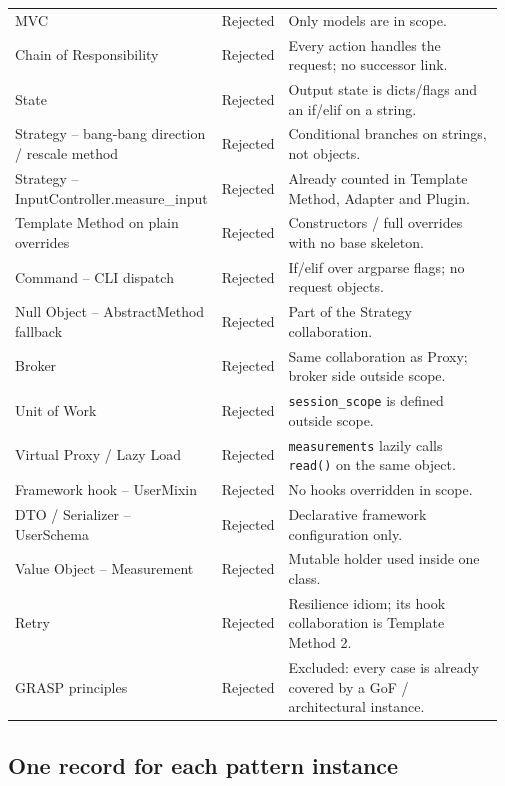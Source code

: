 \documentclass[11pt,a4paper]{article}
\begin{document}
{\begin{longtable}{@{}P{0.29\linewidth}P{0.12\linewidth}P{0.56\linewidth}@{}}
MVC & Rejected & Only models are in scope. \\
Chain of Responsibility & Rejected & Every action handles the request; no successor link. \\
State & Rejected & Output state is dicts/flags and an if/elif on a string. \\
Strategy -- bang-bang direction / rescale method & Rejected & Conditional branches on strings, not objects. \\
Strategy -- InputController.measure\_input & Rejected & Already counted in Template Method, Adapter and Plugin. \\
Template Method on plain overrides & Rejected & Constructors / full overrides with no base skeleton. \\
Command -- CLI dispatch & Rejected & If/elif over argparse flags; no request objects. \\
Null Object -- AbstractMethod fallback & Rejected & Part of the Strategy collaboration. \\
Broker & Rejected & Same collaboration as Proxy; broker side outside scope. \\
Unit of Work & Rejected & \texttt{session\_\allowbreak{}scope} is defined outside scope. \\
Virtual Proxy / Lazy Load & Rejected & \texttt{measurements} lazily calls \texttt{read()} on the same object. \\
Framework hook -- UserMixin & Rejected & No hooks overridden in scope. \\
DTO / Serializer -- UserSchema & Rejected & Declarative framework configuration only. \\
Value Object -- Measurement & Rejected & Mutable holder used inside one class. \\
Retry & Rejected & Resilience idiom; its hook collaboration is Template Method 2. \\
GRASP principles & Rejected & Excluded: every case is already covered by a GoF / architectural instance. \\
\bottomrule\end{longtable}}
\subsection{One record for each pattern instance}
\end{document}
